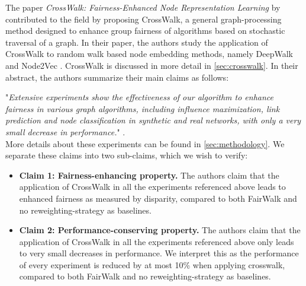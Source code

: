 

The paper \textit{CrossWalk: Fairness-Enhanced Node Representation Learning} by \citet{Khajehnejad2022} contributed to the field by proposing CrossWalk, a general graph-processing method designed to enhance group fairness of algorithms based on stochastic traversal of a graph. In their paper, the authors study the application of CrossWalk to random walk based node embedding methods, namely DeepWalk \citep{Perozzi2014} and Node2Vec \citep{Grover2016}. CrossWalk is discussed in more detail in \autoref{sec:crosswalk}.
In their abstract, the authors summarize their main claims as follows: 

"\textit{Extensive experiments show the effectiveness of our algorithm to enhance fairness in various graph algorithms, including influence maximization, link prediction and node classification in synthetic and real networks, with only a very small decrease in performance.}" \cite{Khajehnejad2022}. \\

More details about these experiments can be found in \autoref{sec:methodology}. We separate these claims into two sub-claims, which we wish to verify:
\begin{itemize}
    \item \textbf{Claim 1: Fairness-enhancing property.} The authors claim that the application of CrossWalk in all the experiments referenced above leads to enhanced fairness as measured by disparity, compared to both FairWalk and no reweighting-strategy as baselines.
    \item \textbf{Claim 2: Performance-conserving property.} The authors claim that the application of CrossWalk in all the experiments referenced above only leads to very small decreases in performance. We interpret this as the performance of every experiment is reduced by at most 10\% when applying crosswalk, compared to both FairWalk and no reweighting-strategy as baselines.
\end{itemize}

